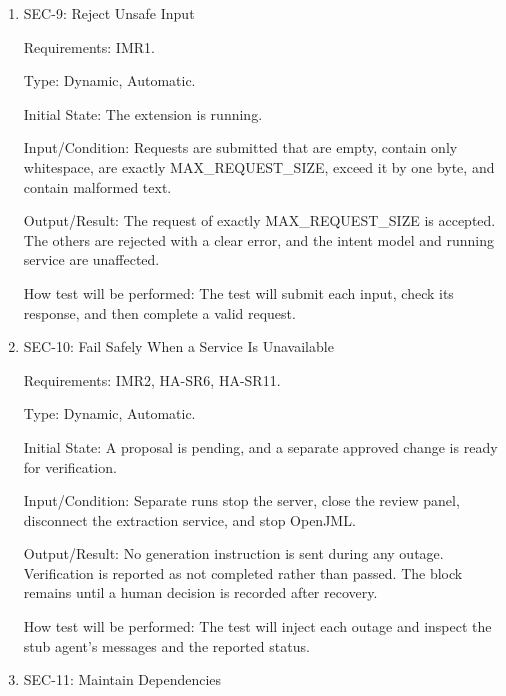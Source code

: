 \documentclass[12pt, titlepage]{article}
\begin{document}
\begin{enumerate}
Input/Condition: The proposal is approved and later amended, then the change is
verified.

Output/Result: The audit record contains the decision outcome, decision time,
modification time, and verification result. The schema has a field that can
attribute each decision to a user.

How test will be performed: The test will compare the record with the performed
actions and inspect the schema. Multi-user attribution itself is outside this test
because it applies only to a future multi-user deployment.

\item{SEC-9: Reject Unsafe Input\\}

Requirements: IMR1.

Type: Dynamic, Automatic.

Initial State: The extension is running.

Input/Condition: Requests are submitted that are empty, contain only whitespace, are
exactly MAX\_REQUEST\_SIZE, exceed it by one byte, and contain malformed text.

Output/Result: The request of exactly MAX\_REQUEST\_SIZE is accepted. The others are
rejected with a clear error, and the intent model and running service are unaffected.

How test will be performed: The test will submit each input, check its response, and
then complete a valid request.

\item{SEC-10: Fail Safely When a Service Is Unavailable\\}

Requirements: IMR2, HA-SR6, HA-SR11.

Type: Dynamic, Automatic.

Initial State: A proposal is pending, and a separate approved change is ready for
verification.

Input/Condition: Separate runs stop the server, close the review panel, disconnect
the extraction service, and stop OpenJML.

Output/Result: No generation instruction is sent during any outage. Verification is
reported as not completed rather than passed. The block remains until a human
decision is recorded after recovery.

How test will be performed: The test will inject each outage and inspect the stub
agent's messages and the reported status.

\item{SEC-11: Maintain Dependencies\\}


\end{enumerate}
\end{document}
